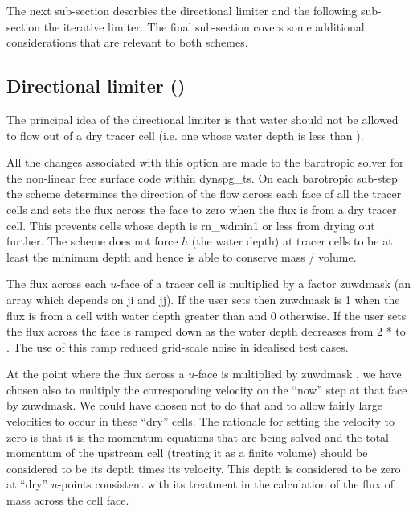 \documentclass[../main/NEMO_manual]{subfiles}
\begin{document}
The next sub-section descrbies the directional limiter and the following sub-section the iterative limiter.
The final sub-section covers some additional considerations that are relevant to both schemes.

\subsection[Directional limiter (\textit{wet\_dry.F90})]{Directional limiter ()}
\label{subsec:DYN_wd_directional_limiter}

The principal idea of the directional limiter is that
water should not be allowed to flow out of a dry tracer cell (i.e. one whose water depth is less than ).

All the changes associated with this option are made to the barotropic solver for the non-linear
free surface code within dynspg\_ts.
On each barotropic sub-step the scheme determines the direction of the flow across each face of all the tracer cells
and sets the flux across the face to zero when the flux is from a dry tracer cell. This prevents cells
whose depth is rn\_wdmin1 or less from drying out further. The scheme does not force $h$ (the water depth) at tracer cells
to be at least the minimum depth and hence is able to conserve mass / volume.

The flux across each $u$-face of a tracer cell is multiplied by a factor zuwdmask (an array which depends on ji and jj).
If the user sets  then zuwdmask is 1 when the
flux is from a cell with water depth greater than  and 0 otherwise. If the user sets
 the flux across the face is ramped down as the water depth decreases
from 2 *  to . The use of this ramp reduced grid-scale noise in idealised test cases.

At the point where the flux across a $u$-face is multiplied by zuwdmask , we have chosen
also to multiply the corresponding velocity on the ``now'' step at that face by zuwdmask. We could have
chosen not to do that and to allow fairly large velocities to occur in these ``dry'' cells.
The rationale for setting the velocity to zero is that it is the momentum equations that are being solved
and the total momentum of the upstream cell (treating it as a finite volume) should be considered
to be its depth times its velocity. This depth is considered to be zero at ``dry'' $u$-points consistent with its
treatment in the calculation of the flux of mass across the cell face.
\end{document}
